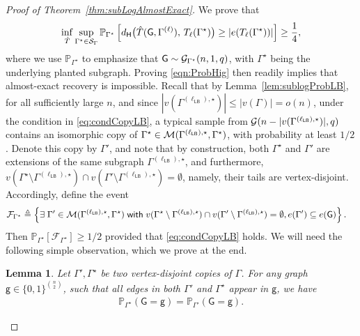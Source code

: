 \documentclass[12pt]{article}
\newtheorem{lemma}{Lemma}
\newcommand {\pr} {\mathbb{P}}
\newcommand{\calG}{{\cal G}}
\newcommand{\calM}{{\cal M}}
\newcommand{\calS}{{\cal S}}
\newcommand{\s}[1]{\mathsf{#1}}
\begin{document}
\begin{proof}[Proof of Theorem~\ref{thm:subLogAlmostExact}]
We prove that
\begin{align}
\inf_{\hat T}\sup_{\Gamma^\star\in\calS_\Gamma}
\pr_{\Gamma^\star}\left[d_{\s{H}}\big(\hat T(\s{G},\Gamma^{(\ell)}),\,T_\ell(\Gamma^\star)\big)\geq|e(T_\ell(\Gamma^\star))|\right]\geq\frac{1}{4},\label{eqn:ProbHig}
\end{align}
where we use $\pr_{\Gamma^\star}$ to emphasize that $\s{G}\sim\calG_{\Gamma^\star}(n,1,q)$, with $\Gamma^\star$ being the underlying planted subgraph. Proving \eqref{eqn:ProbHig} then readily implies that almost-exact recovery is impossible. 
Recall that by Lemma~\ref{lem:sublogProbLB}, for all sufficiently large $n$, and since $|v(\Gamma^{(\ell_{\s{LB}}),\star})|\leq|v(\Gamma)|=o(n)$, under the condition in \eqref{eq:condCopyLB}, a typical sample from $\calG(n-|v(\Gamma^{(\ell_{\s{LB}}),\star})|,q)$ contains an isomorphic copy of $\Gamma^\star\in\calM(\Gamma^{(\ell_{\s{LB}}),\star},\Gamma^\star)$, with probability at least $1/2$. Denote this copy by $\Gamma'$, and note that by construction, both $\Gamma^\star$ and $\Gamma'$ are extensions of the same subgraph $\Gamma^{(\ell_{\s{LB}}),\star}$, and furthermore, $v(\Gamma^\star\setminus\Gamma^{(\ell_{\s{LB}}),\star})\cap v(\Gamma'\setminus\Gamma^{(\ell_{\s{LB}}),\star})=\emptyset$, namely, their tails are vertex-disjoint. Accordingly, define the event
\begin{align}
&\mathcal{F}_{\Gamma^\star}\triangleq\left\{\exists\;\Gamma'\in\calM(\Gamma^{(\ell_{\s{LB}}),\star},\Gamma^\star)\;\s{with}\;v(\Gamma^\star\setminus\Gamma^{(\ell_{\s{LB}}),\star})\cap v(\Gamma'\setminus\Gamma^{(\ell_{\s{LB}}),\star})=\emptyset ,e(\Gamma')\subseteq e(\s{G})\right\}.
\end{align}
Then $\pr_{\Gamma^\star}[\mathcal{F}_{\Gamma^\star}]\geq1/2$ provided that \eqref{eq:condCopyLB} holds. We will need the following simple observation, which we prove at the end.
\begin{lemma}\label{lem:symmetryTwoCop}
Let $\Gamma',\Gamma^\star$ be two vertex-disjoint copies of $\Gamma$. For any graph $\s{g}\in\{0,1\}^{\binom{n}{2}}$, such that all edges in both $\Gamma'$ and $\Gamma^\star$ appear in $\s{g}$, we have
\begin{align}
\pr_{\Gamma^\star}(\s{G}=\s{g})=\pr_{\Gamma'}(\s{G}=\s{g}).
\end{align}

\end{lemma}
\end{proof}
\end{document}
